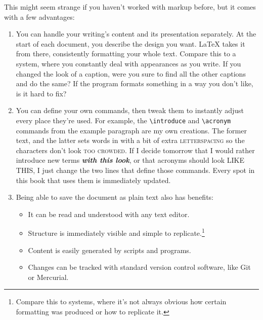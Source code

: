 This might seem strange if you haven't worked with markup before,
but it comes with a few advantages:
\begin{enumerate}
\item You can handle your writing's content and its presentation separately.
    At the start of each document,
    you describe the design you want.
    \LaTeX{} takes it from there, consistently formatting your whole text.
    Compare this to a  system,
    where you constantly deal with appearances
    as you write.
    If you changed the look of a caption,
    were you sure to find all the other captions and do the
    same?
    If the program formats something in a way you don't like,
    is it hard to fix?%

\item You can define your own commands, then tweak them to instantly adjust
    every place they're used.
    For example, the \verb|\introduce| and \verb|\acronym| commands
    from the example paragraph are my own creations.
    The former  text, and the latter sets words in
     with a bit of extra
    \mbox{\textsc{letterspacing}} so the characters
    don't look \textsc{too crowded}.
    If I decide tomorrow that I would rather introduce new terms
    \textbf{\itshape with this look}, or that acronyms should look
    {\small{} LIKE THIS},
    I just change the two lines that define those commands.
    Every spot in this book that uses them is immediately updated.

\item Being able to save the document as plain text also has benefits:
    \begin{itemize}
    \item It can be read and understood with any text editor.
    \item Structure is immediately visible
        and simple to replicate.\punckern\footnote{Compare this to
         systems, where it's not always obvious
        how certain formatting was produced or how to replicate it.}
    \item Content is easily generated by scripts and programs.
    \item Changes can be tracked with standard version control software,
        like Git or Mercurial.
    \end{itemize}
\end{enumerate}

